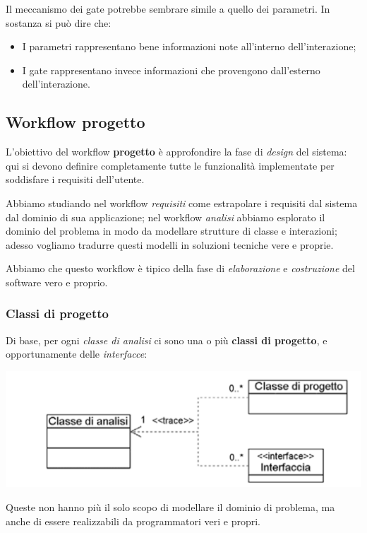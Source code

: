 \documentclass[a4paper,11pt]{article}
\begin{document}
Il meccanismo dei gate potrebbe sembrare simile a quello dei parametri. In sostanza si può dire che:
\begin{itemize}
	\item I parametri rappresentano bene informazioni note all'interno dell'interazione;
	\item I gate rappresentano invece informazioni che provengono dall'esterno dell'interazione.
\end{itemize}

\subsection{Workflow progetto}
L'obiettivo del workflow \textbf{progetto} è approfondire la fase di \textit{design} del sistema: qui si devono definire completamente tutte le funzionalità implementate per soddisfare i requisiti dell'utente.

Abbiamo studiando nel workflow \textit{requisiti} come estrapolare i requisiti dal sistema dal dominio di sua applicazione; nel workflow \textit{analisi} abbiamo esplorato il dominio del problema in modo da modellare strutture di classe e interazioni; adesso vogliamo tradurre questi modelli in soluzioni tecniche vere e proprie.

Abbiamo che questo workflow è tipico della fase di \textit{elaborazione} e \textit{costruzione} del software vero e proprio.

\subsubsection{Classi di progetto}
Di base, per ogni \textit{classe di analisi} ci sono una o più \textbf{classi di progetto}, e opportunamente delle \textit{interfacce}:
\begin{center}
	\includegraphics[scale=0.4]{../figures/classi_analisi_progetto.png}
\end{center}

Queste non hanno più il solo scopo di modellare il dominio di problema, ma anche di essere realizzabili da programmatori veri e propri. 
\end{document}

